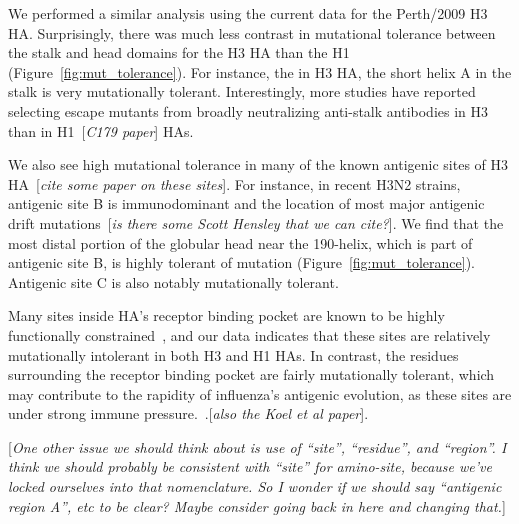 \documentclass[9pt,twocolumn,twoside]{pnas-new}
\newcommand{\comment}[1]{{\color{red}[\textsl{#1}]}}
\begin{document}
We performed a similar analysis using the current data for the Perth/2009 H3 HA.
Surprisingly, there was much less contrast in mutational tolerance between the stalk and head domains for the H3 HA than the H1 (Figure~\ref{fig:mut_tolerance}).
For instance, the in H3 HA, the short helix A in the stalk is very mutationally tolerant.
Interestingly, more studies have reported selecting escape mutants from broadly neutralizing anti-stalk antibodies in H3~\cite{ekiert2011highly, friesen2014common, chai2016two, yamayoshi2017human} than in H1~\cite{doud2017quantifying}\comment{C179 paper} HAs.

We also see high mutational tolerance in many of the known antigenic sites of H3 HA~\comment{cite some paper on these sites}.
For instance, in recent H3N2 strains, antigenic site B is immunodominant and the location of most major antigenic drift mutations~\comment{is there some Scott Hensley that we can cite?}.
We find that the most distal portion of the globular head near the 190-helix, which is part of antigenic site B, is highly tolerant of mutation (Figure~\ref{fig:mut_tolerance}).
Antigenic site C is also notably mutationally tolerant.

Many sites inside HA's receptor binding pocket are known to be highly functionally constrained~\citep{wilson1981structure,martin1998studies}, and our data indicates that these sites are relatively mutationally intolerant in both H3 and H1 HAs.
In contrast, the residues surrounding the receptor binding pocket are fairly mutationally tolerant, which may contribute to the rapidity of influenza's antigenic evolution, as these sites are under strong immune pressure.~\citep{wiley1981structural}.\comment{also the Koel et al paper}.

\comment{One other issue we should think about is use of ``site'', ``residue'', and ``region''. I think we should probably be consistent with ``site'' for amino-site, because we've locked ourselves into that nomenclature. So I wonder if we should say ``antigenic region A'', etc to be clear? Maybe consider going back in here and changing that.}
\end{document}
